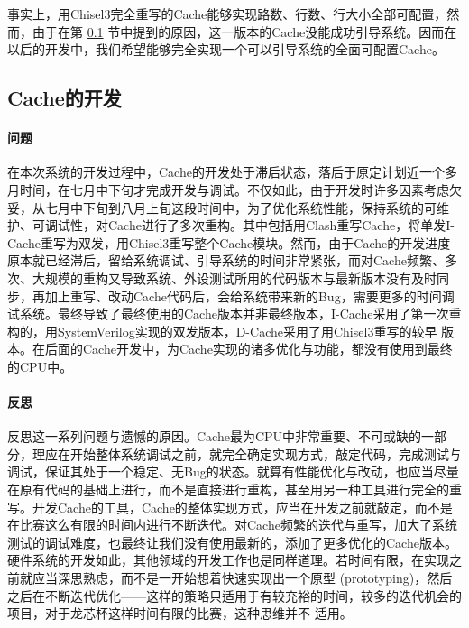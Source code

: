 事实上，用Chisel3完全重写的Cache能够实现路数、行数、行大小全部可配置，然而，由于在第 \ref{sec:cache-caveat-pitfalls} 节中提到的原因，这一版本的Cache没能成功引导系统。因而在以后的开发中，我们希望能够完全实现一个可以引导系统的全面可配置Cache。

\subsection{Cache的开发}
\label{sec:cache-caveat-pitfalls}

\paragraph{问题} 在本次系统的开发过程中，Cache的开发处于滞后状态，落后于原定计划近一个多月时间，在七月中下旬才完成开发与调试。不仅如此，由于开发时许多因素考虑欠妥，从七月中下旬到八月上旬这段时间中，为了优化系统性能，保持系统的可维护、可调试性，对Cache进行了多次重构。其中包括用Clash重写Cache，将单发I-Cache重写为双发，用Chisel3重写整个Cache模块。然而，由于Cache的开发进度原本就已经滞后，留给系统调试、引导系统的时间非常紧张，而对Cache频繁、多次、大规模的重构又导致系统、外设测试所用的代码版本与最新版本没有及时同步，再加上重写、改动Cache代码后，会给系统带来新的Bug，需要更多的时间调试系统。最终导致了最终使用的Cache版本并非最终版本，I-Cache采用了第一次重构的，用SystemVerilog实现的双发版本，D-Cache采用了用Chisel3重写的较早
版本。在后面的Cache开发中，为Cache实现的诸多优化与功能，都没有使用到最终的CPU中。

\paragraph{反思} 反思这一系列问题与遗憾的原因。Cache最为CPU中非常重要、不可或缺的一部分，理应在开始整体系统调试之前，就完全确定实现方式，敲定代码，完成测试与调试，保证其处于一个稳定、无Bug的状态。就算有性能优化与改动，也应当尽量在原有代码的基础上进行，而不是直接进行重构，甚至用另一种工具进行完全的重写。开发Cache的工具，Cache的整体实现方式，应当在开发之前就敲定，而不是在比赛这么有限的时间内进行不断迭代。对Cache频繁的迭代与重写，加大了系统测试的调试难度，也最终让我们没有使用最新的，添加了更多优化的Cache版本。硬件系统的开发如此，其他领域的开发工作也是同样道理。若时间有限，在实现之前就应当深思熟虑，而不是一开始想着快速实现出一个原型 (prototyping)，然后之后在不断迭代优化——这样的策略只适用于有较充裕的时间，较多的迭代机会的项目，对于龙芯杯这样时间有限的比赛，这种思维并不
适用。

